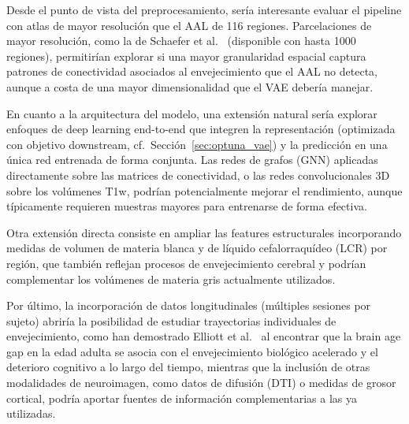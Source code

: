 Desde el punto de vista del preprocesamiento, sería interesante evaluar el pipeline con atlas de mayor resolución que el AAL de 116 regiones. Parcelaciones de mayor resolución, como la de Schaefer et al.\ \cite{schaefer2018local} (disponible con hasta 1000 regiones), permitirían explorar si una mayor granularidad espacial captura patrones de conectividad asociados al envejecimiento que el AAL no detecta, aunque a costa de una mayor dimensionalidad que el VAE debería manejar.

En cuanto a la arquitectura del modelo, una extensión natural sería explorar enfoques de deep learning end-to-end que integren la representación (optimizada con objetivo downstream, cf.\ Sección~\ref{sec:optuna_vae}) y la predicción en una única red entrenada de forma conjunta. Las redes de grafos (GNN) aplicadas directamente sobre las matrices de conectividad, o las redes convolucionales 3D sobre los volúmenes T1w, podrían potencialmente mejorar el rendimiento, aunque típicamente requieren muestras mayores para entrenarse de forma efectiva.

Otra extensión directa consiste en ampliar las features estructurales incorporando medidas de volumen de materia blanca y de líquido cefalorraquídeo (LCR) por región, que también reflejan procesos de envejecimiento cerebral y podrían complementar los volúmenes de materia gris actualmente utilizados.

Por último, la incorporación de datos longitudinales (múltiples sesiones por sujeto) abriría la posibilidad de estudiar trayectorias individuales de envejecimiento, como han demostrado Elliott et al.\ \cite{elliott2019brain} al encontrar que la brain age gap en la edad adulta se asocia con el envejecimiento biológico acelerado y el deterioro cognitivo a lo largo del tiempo, mientras que la inclusión de otras modalidades de neuroimagen, como datos de difusión (DTI) o medidas de grosor cortical, podría aportar fuentes de información complementarias a las ya utilizadas.